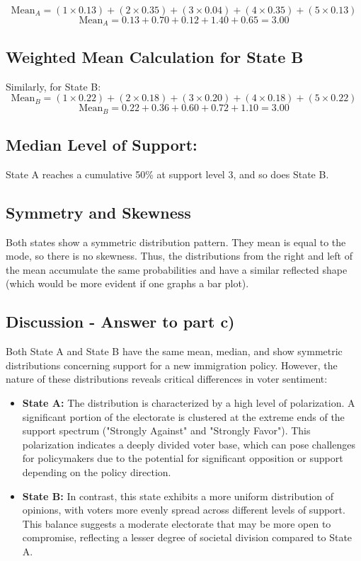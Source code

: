 \documentclass{article}
\begin{document}
\[
\text{Mean}_A = (1 \times 0.13) + (2 \times 0.35) + (3 \times 0.04) + (4 \times 0.35) + (5 \times 0.13)
\]
\[
\text{Mean}_A = 0.13 + 0.70 + 0.12 + 1.40 + 0.65 = 3.00
\]

\subsection*{Weighted Mean Calculation for State B}

Similarly, for State B:
\[
\text{Mean}_B = (1 \times 0.22) + (2 \times 0.18) + (3 \times 0.20) + (4 \times 0.18) + (5 \times 0.22)
\]
\[
\text{Mean}_B = 0.22 + 0.36 + 0.60 + 0.72 + 1.10 = 3.00
\]

\subsection*{Median Level of Support:}

State A reaches a cumulative 50\% at support level 3, and so does State B.

\subsection*{Symmetry and Skewness}

Both states show a symmetric distribution pattern. They mean is equal to the mode, so there is no skewness. Thus, the distributions from the right and left of the mean accumulate the same probabilities and have a similar reflected shape (which would be more evident if one graphs a bar plot).

\subsection*{Discussion - Answer to part c)}

Both State A and State B have the same mean, median, and show symmetric distributions concerning support for a new immigration policy. However, the nature of these distributions reveals critical differences in voter sentiment:

\begin{itemize}
    \item \textbf{State A:} The distribution is characterized by a high level of polarization. A significant portion of the electorate is clustered at the extreme ends of the support spectrum ("Strongly Against" and "Strongly Favor"). This polarization indicates a deeply divided voter base, which can pose challenges for policymakers due to the potential for significant opposition or support depending on the policy direction.
    
    \item \textbf{State B:} In contrast, this state exhibits a more uniform distribution of opinions, with voters more evenly spread across different levels of support. This balance suggests a moderate electorate that may be more open to compromise, reflecting a lesser degree of societal division compared to State A.
\end{itemize}
\end{document}
